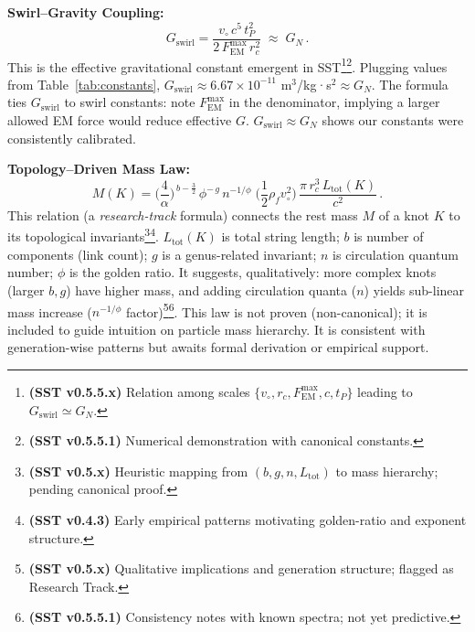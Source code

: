 \documentclass[reprint,aps,onecolumn,nofootinbib]{revtex4-2}
\newcommand{\rc}{r_c}                                    %
\newcommand{\FmaxEM}{F_{\mathrm{EM}}^{\max}}             %
\begin{document}
\begin{tcolorbox}[title=Master Equations of SST (\canonversion)]
    \textbf{Swirl–Gravity Coupling:}
    \[
        G_{\text{swirl}} = \frac{v_{\circ}\,c^5\,t_P^2}{2\,\FmaxEM\,r_c^2} \;\approx\; G_N\,.
    \]
    This is the effective gravitational constant emergent in SST\footnote{\textbf{(SST v0.5.5.x)} Relation among scales $\{v_{\circ},\rc,\FmaxEM,c,t_P\}$ leading to $G_{\text{swirl}}\simeq G_N$.}\footnote{\textbf{(SST v0.5.5.1)} Numerical demonstration with canonical constants.}. Plugging values from Table~\ref{tab:constants}, $G_{\text{swirl}}\approx 6.67\times10^{-11}$ m$^3$/kg·s$^2 \approx G_N$. The formula ties $G_{\text{swirl}}$ to swirl constants: note $\FmaxEM$ in the denominator, implying a larger allowed EM force would reduce effective $G$. $G_{\text{swirl}}\approx G_N$ shows our constants were consistently calibrated.

    \textbf{Topology–Driven Mass Law:}
    \[
        M (K) = \Big(\frac{4}{\alpha}\Big)^{\,b-\frac{3}{2}}\,\phi^{-\,g}\,n^{-1/\phi}\;\Big(\frac{1}{2}\rho_f v_{\circ}^2\Big)\,\frac{\pi\,r_c^3\,L_{\text{tot}}(K)}{c^2}\,.
    \]
    This relation (a \emph{research-track} formula) connects the rest mass $M$ of a knot $K$ to its topological invariants\footnote{\textbf{(SST v0.5.x)} Heuristic mapping from $(b,g,n,L_{\text{tot}})$ to mass hierarchy; pending canonical proof.}\footnote{\textbf{(SST v0.4.3)} Early empirical patterns motivating golden-ratio and exponent structure.}. $L_{\text{tot}}(K)$ is total string length; $b$ is number of components (link count); $g$ is a genus-related invariant; $n$ is circulation quantum number; $\phi$ is the golden ratio. It suggests, qualitatively: more complex knots (larger $b,g$) have higher mass, and adding circulation quanta ($n$) yields sub-linear mass increase ($n^{-1/\phi}$ factor)\footnote{\textbf{(SST v0.5.x)} Qualitative implications and generation structure; flagged as Research Track.}\footnote{\textbf{(SST v0.5.5.1)} Consistency notes with known spectra; not yet predictive.}. This law is not proven (non-canonical); it is included to guide intuition on particle mass hierarchy. It is consistent with generation-wise patterns but awaits formal derivation or empirical support.
    \end{tcolorbox}
\end{document}
